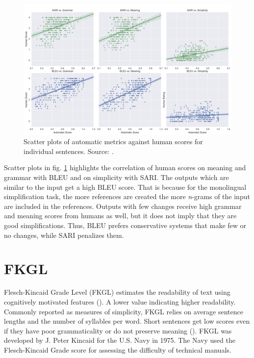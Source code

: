 \begin{figure}[h]
    \centering
    \includegraphics[width=14cm]{Images/bleu-sari.png}
    \caption{Scatter plots of automatic metrics against human scores for individual sentences. Source: \cite{xu-etal-2016-optimizing}.}
    \label{fig:bleu-sari}
\end{figure}

\bigskip
Scatter plots in fig. \ref{fig:bleu-sari} highlights the correlation of human scores on meaning and grammar with BLEU and on simplicity with SARI. The outputs which are similar to the input get a high BLEU score. That is because for the monolingual simplification task, the more references are created the more \textit{n}-grams of the input are included in the references. Outputs with few changes receive high grammar and meaning scores from humans as well, but it does not imply that they are good simplifications. Thus, BLEU prefers conservative systems that make few or no changes, while SARI penalizes them.

\section{FKGL}

Flesch-Kincaid Grade Level (FKGL) estimates the readability of text using cognitively motivated features (\cite{Kincaid1975DerivationON}). A lower value indicating higher readability. Commonly reported as measures of simplicity, FKGL relies on average sentence lengths and the number of syllables per word. Short sentences get low scores even if they have poor grammaticality or do not preserve meaning (\cite{wubben-etal-2012-sentence}). FKGL was developed by J. Peter Kincaid for the U.S. Navy in 1975. The Navy used the Flesch-Kincaid Grade score for assessing the difficulty of technical manuals.

